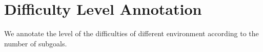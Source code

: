 \section{Difficulty Level Annotation\label{sec:difficulty_level_annotation}}

We annotate the level of the difficulties of different environment according to the number of subgoals.